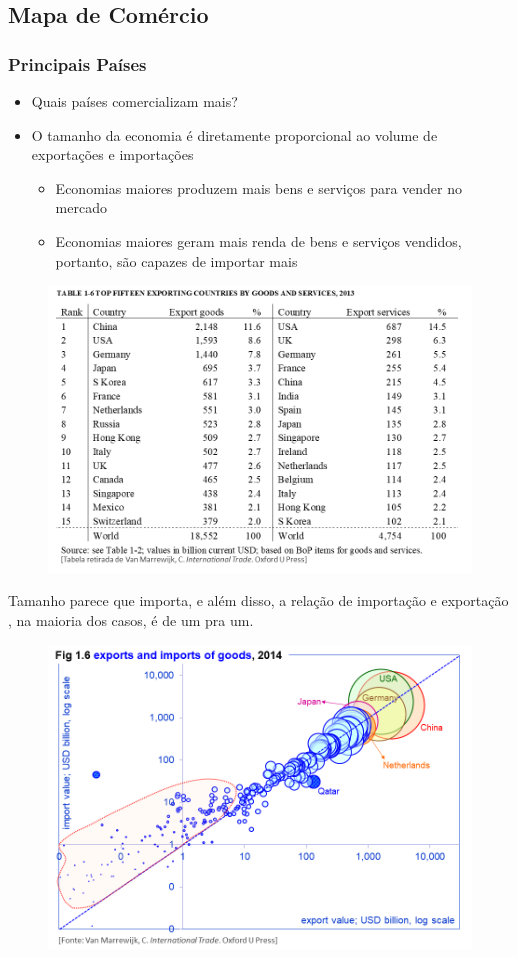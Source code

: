 \documentclass[a4paper,12pt]{article}[abntex2]
\begin{document}
\subsection{\textbf{Mapa de Comércio}}
\subsubsection{\textbf{Principais Países}}
\begin{itemize}
    \item Quais países comercializam mais?
    \item O tamanho da economia é diretamente proporcional ao volume de exportações e importações\begin{itemize}
        \item Economias maiores produzem mais bens e serviços para vender no mercado
        \item Economias maiores geram mais renda de bens e serviços vendidos, portanto, são capazes de importar mais
    \end{itemize}
\end{itemize}

\begin{figure}[H]
    \centering
    \includegraphics[width=0.70\linewidth]{Imagens/a1i8.png}
\end{figure}

Tamanho parece que importa, e além disso, a relação de importação e exportação , na maioria dos casos, é de um pra um.

\begin{figure}
    \centering
    \includegraphics[width=0.70\linewidth]{Imagens/a1i9.png}
\end{figure}
\end{document}
